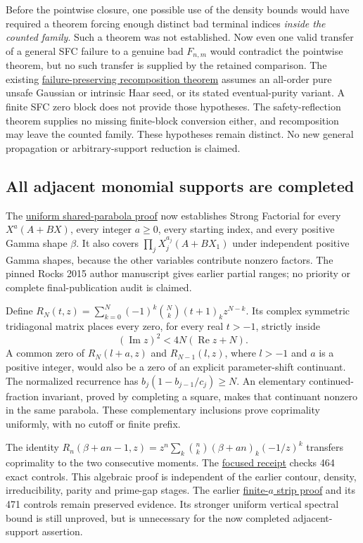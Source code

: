 \documentclass[11pt]{article}
\begin{document}
Before the pointwise closure, one possible use of the density bounds
would have required a theorem forcing enough distinct bad terminal indices
\emph{inside the counted family}. Such a theorem was not established.
Now even one valid transfer of a general SFC failure to a genuine bad
$F_{n,m}$ would contradict the pointwise theorem, but no such transfer is
supplied by the retained comparison.
The existing
\href{../moment-vanishing-audit/POLYNOMIAL_RECOMPOSITION_REFLECTION_AND_UNIVERSAL_FAILURE.md}{failure-preserving recomposition theorem}
assumes an all-order pure unsafe Gaussian or intrinsic Haar seed, or its
stated eventual-purity variant. A finite SFC zero block does not provide
those hypotheses. The safety-reflection theorem supplies no missing
finite-block conversion either, and recomposition may leave the counted
family. These hypotheses remain distinct. No new general propagation
or arbitrary-support reduction is claimed.

\subsection*{All adjacent monomial supports are completed}
The \href{UNIFORM_PADE_PARABOLA_SFC.tex}{uniform shared-parabola proof}
now establishes Strong Factorial for every $X^a(A+BX)$, every integer
$a\ge0$, every starting index, and every positive Gamma shape $\beta$.
It also covers $\prod_j X_j^{a_j}(A+BX_1)$ under independent positive
Gamma shapes, because the other variables contribute nonzero factors.
The pinned Rocks 2015 author manuscript gives earlier partial ranges;
no priority or complete final-publication audit is claimed.

Define $R_N(t,z)=\sum_{k=0}^N(-1)^k\binom Nk(t+1)_kz^{N-k}$.
Its complex symmetric tridiagonal matrix places every zero, for every
real $t>-1$, strictly inside
\[
                   (\operatorname{Im}z)^2<4N(\operatorname{Re}z+N).
\]
A common zero of $R_N(l+a,z)$ and $R_{N-1}(l,z)$, where $l>-1$ and
$a$ is a positive integer, would also be a zero of an explicit
parameter-shift continuant. The normalized recurrence has
$b_j(1-b_{j-1}/c_j)\ge N$. An elementary continued-fraction invariant,
proved by completing a square, makes that continuant nonzero in the
same parabola. These complementary inclusions prove coprimality
uniformly, with no cutoff or finite prefix.

The identity
$R_n(\beta+an-1,z)=z^n\sum_k\binom nk(\beta+an)_k(-1/z)^k$
transfers coprimality to the two consecutive moments.
The \href{pade_parabola_sfc_verification.json}{focused receipt} checks
464 exact controls. This algebraic proof is independent of the earlier
contour, density, irreducibility, parity and prime-gap stages.
The earlier \href{PADE_ADJACENT_MONOMIALS.tex}{finite-$a$ strip proof}
and its 471 controls remain preserved evidence. Its stronger uniform
vertical spectral bound is still unproved, but is unnecessary for the
now completed adjacent-support assertion.
\end{document}
